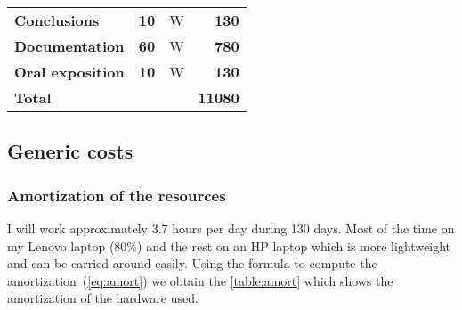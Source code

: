 \begin{table}[H]
\begin{tabular}{lrcr}
    \addlinespace[0.5em]
        \textbf{Conclusions} & \textbf{10} & W & \textbf{130} \\
        \textbf{Documentation} & \textbf{60} & W & \textbf{780}\\
        \textbf{Oral exposition} & \textbf{10} & W & \textbf{130} \\
    \addlinespace[1em]
        \textbf{Total} & & & \textbf{11080} \\

        \bottomrule
    \end{tabular}
\end{table}



\pagebreak
\subsection{Generic costs}


\subsubsection{Amortization of the resources}

I will work approximately 3.7 hours per day during 130 days. Most of the time on
my Lenovo laptop (80\%) and the rest on an HP laptop which is more lightweight
and can be carried around easily. Using the formula to compute the
amortization~(\cref{eq:amort}) we obtain the \cref{table:amort} which shows the
amortization of the hardware used.

